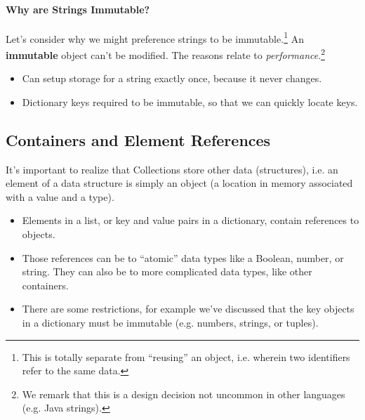 \documentclass[12pt,letterpaper,twoside]{article}
\begin{document}
\begin{enumerate}
\paragraph{Why are Strings Immutable?}
Let's consider why we might preference strings to be immutable.\footnote{This is totally separate from ``reusing'' an object, i.e. wherein two identifiers refer
to the same data.} An \textbf{immutable} object can't be modified. The reasons relate to \emph{performance}.\footnote{We remark that this is a design decision not uncommon in other languages (e.g. Java strings).}
\begin{itemize}
\item Can setup storage for a string exactly once, because it never changes.
\item Dictionary keys required to be immutable, so that we can quickly locate keys.
\end{itemize}

\subsection{Containers and Element References}
It's important to realize that Collections store other data (structures), i.e. an element of a data structure
is simply an object (a location in memory associated with a value and a type).

\begin{itemize}
\item
  Elements in a list, or key and value pairs in a dictionary,
  contain references to objects.
\item
  Those references can be to ``atomic'' data types like a Boolean, number, or
  string. They can also be to more complicated data types, like other containers.
\item
  There are some restrictions, for example we've discussed that the key objects in a
  dictionary must be immutable (e.g. numbers, strings, or tuples).
\end{itemize}


\end{enumerate}
\end{document}

